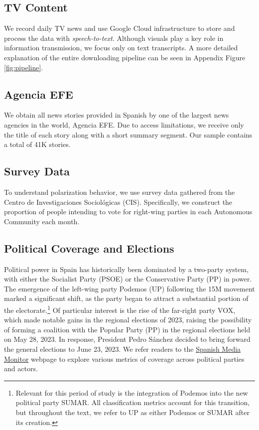 \documentclass[12pt]{article}
\begin{document}
\subsection*{TV Content}

We record daily TV news and use Google Cloud infrastructure to store and process the data with \textit{speech-to-text}. Although visuals play a key role in information transmission, we focus only on text transcripts. A more detailed explanation of the entire downloading pipeline can be seen in Appendix Figure \ref{fig:pipeline}.


\subsection*{Agencia EFE}

We obtain all news stories provided in Spanish by one of the largest news agencies in the world, Agencia EFE. Due to access limitations, we receive only the title of each story along with a short summary segment. Our sample contains a total of 41K stories.

\subsection*{Survey Data}

To understand polarization behavior, we use survey data gathered from the Centro de Investigaciones Sociológicas (CIS). Specifically, we construct the proportion of people intending to vote for right-wing parties in each Autonomous Community each month.

\subsection{Political Coverage and Elections}

Political power in Spain has historically been dominated by a two-party system, with either the Socialist Party (PSOE) or the Conservative Party (PP) in power. The emergence of the left-wing party Podemos (UP) following the 15M movement marked a significant shift, as the party began to attract a substantial portion of the electorate.\footnote{Relevant for this period of study is the integration of Podemos into the new political party SUMAR. All classification metrics account for this transition, but throughout the text, we refer to UP as either Podemos or SUMAR after its creation.} Of particular interest is the rise of the far-right party VOX, which made notable gains in the regional elections of 2023, raising the possibility of forming a coalition with the Popular Party (PP) in the regional elections held on May 28, 2023. In response, President Pedro Sánchez decided to bring forward the general elections to June 23, 2023. We refer readers to the \href{https://luisignaciomenendez.github.io/media_monitor/index.html}{Spanish Media Monitor} webpage to explore various metrics of coverage across political parties and actors.
\end{document}
